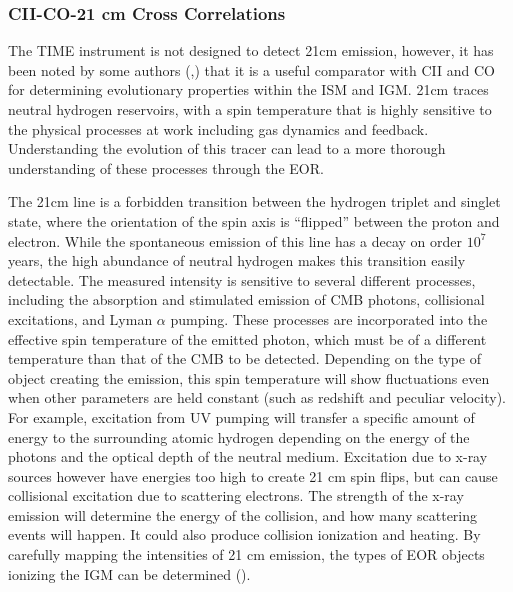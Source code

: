 \documentclass[manuscript]{aastex}
\begin{document}
\subsubsection{\textbf{CII-CO-21 cm Cross Correlations}}
The TIME instrument is not designed to detect 21cm emission, however, it has been noted by some authors (\cite{Zaroubi2012},\cite{Gong2012}) that it is a useful comparator with CII and CO for determining evolutionary properties within the ISM and IGM. 
21cm traces neutral hydrogen reservoirs, with a spin temperature that is highly sensitive to the physical processes at work including gas dynamics and feedback. Understanding the evolution of this tracer can lead to a more thorough understanding of these processes through the EOR. 

The 21cm line is a forbidden transition between the hydrogen triplet and singlet state, where the orientation of the spin axis is ``flipped'' between the proton and electron. While the spontaneous emission of this line has a decay on order $10^{7}$ years, the high abundance of neutral hydrogen makes this transition easily detectable. The measured intensity is sensitive to several different processes, including the absorption and stimulated emission of CMB photons, collisional excitations, and Lyman $\alpha$ pumping. These processes are incorporated into the effective spin temperature of the emitted photon, which must be of a different temperature than that of the CMB to be detected. Depending on the type of object creating the emission, this spin temperature will show fluctuations even when other parameters are held constant (such as redshift and peculiar velocity). For example, excitation from UV pumping will transfer a specific amount of energy to the surrounding atomic hydrogen depending on the energy of the photons and the optical depth of the neutral medium. Excitation due to x-ray sources however have energies too high to create 21 cm spin flips, but can cause collisional excitation due to scattering electrons. The strength of the x-ray emission will determine the energy of the collision, and how many scattering events will happen. It could also produce collision ionization and heating. By carefully mapping the intensities of 21 cm emission, the types of EOR objects ionizing the IGM can be determined (\cite{Zaroubi2012}).
\end{document}
